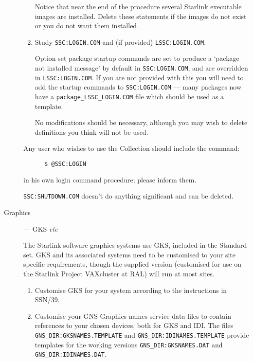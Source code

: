 \begin{description}
\begin{enumerate}
Notice that near the end of the procedure several Starlink executable images
are installed. Delete these statements if the images do not exist or you do not
want them installed.

\item Study {\tt SSC:\-LOGIN.\-COM} and (if provided) {\tt LSSC:\-LOGIN.\-COM}.

Option set package startup commands are set to produce a `package not installed
message' by default in {\tt SSC:LOGIN.COM}, and are overridden in 
{\tt LSSC:LOGIN.COM}. If you are not provided with this you will need to add
the startup commands to  {\tt SSC:LOGIN.COM} --- many packages now have 
a {\tt package\_LSSC\-\_LOGIN.COM} file which should be used as a template.

No modifications should be necessary, although you may wish to delete
definitions you think will not be used.

\end{enumerate}

Any user who wishes to use the Collection should include the command:
\begin{verbatim}
      $ @SSC:LOGIN			
\end{verbatim}
in his own login command procedure; please inform them.

{\tt SSC:SHUTDOWN.COM} doesn't do anything significant and can be deleted.

\item [Graphics] --- GKS {\em etc}

The Starlink software graphics systems use GKS, included in the Standard set.
GKS and its associated systems need to be customised to your site specific
requirements, though the supplied version (customised for use on the Starlink
Project VAXcluster at RAL) will run at most sites.

\begin{enumerate} \item Customise GKS for your system according to the
instructions in SSN/39. \item Customise your GNS Graphics names service data
files to contain references to your chosen devices, both for GKS and IDI. The
files  {\tt GNS\_DIR:GKSNAMES.TEMPLATE} and {\tt GNS\_DIR:IDINAMES.TEMPLATE}
provide templates for the working versions {\tt GNS\_DIR:\-GKSNAMES.\-DAT} and
{\tt GNS\_DIR:\-IDINAMES.DAT}.

\end{enumerate}

\end{description}

